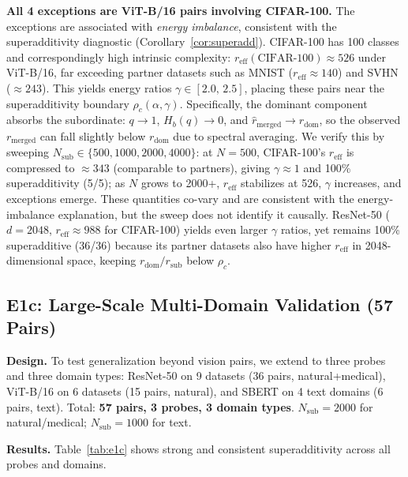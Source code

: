\documentclass{article}
\begin{document}
\textbf{All 4 exceptions are ViT-B/16 pairs involving CIFAR-100.}
The exceptions are associated with \emph{energy imbalance}, consistent with
the superadditivity diagnostic (Corollary~\ref{cor:superadd}).
CIFAR-100 has 100 classes and correspondingly high intrinsic complexity:
$r_{\mathrm{eff}}(\text{CIFAR-100})\approx526$ under ViT-B/16, far exceeding
partner datasets such as MNIST ($r_{\mathrm{eff}}\approx140$) and SVHN ($\approx243$).
This yields energy ratios $\gamma\in[2.0,\,2.5]$, placing these pairs
near the superadditivity boundary $\rho_c(\alpha,\gamma)$.
Specifically, the dominant component absorbs the subordinate:
$q\to1$, $H_b(q)\to0$, and $\hat{r}_{\mathrm{merged}}\to r_{\mathrm{dom}}$,
so the observed $r_{\mathrm{merged}}$ can fall slightly below $r_{\mathrm{dom}}$
due to spectral averaging.
We verify this by sweeping $N_{\mathrm{sub}}\in\{500,1000,2000,4000\}$:
at $N{=}500$, CIFAR-100's $r_{\mathrm{eff}}$ is compressed to $\approx343$
(comparable to partners), giving $\gamma\approx1$ and 100\% superadditivity (5/5);
as $N$ grows to 2000+, $r_{\mathrm{eff}}$ stabilizes at 526, $\gamma$ increases,
and exceptions emerge.  These quantities co-vary and are consistent with the
energy-imbalance explanation, but the sweep does not identify it causally.
ResNet-50 ($d{=}2048$, $r_{\mathrm{eff}}\approx988$ for CIFAR-100)
yields even larger $\gamma$ ratios, yet remains 100\% superadditive (36/36)
because its partner datasets also have higher $r_{\mathrm{eff}}$ in 2048-dimensional space,
keeping $r_{\mathrm{dom}}/r_{\mathrm{sub}}$ below $\rho_c$.

\subsection{E1c: Large-Scale Multi-Domain Validation (57 Pairs)}
\label{sec:e1c}

\textbf{Design.}
To test generalization beyond vision pairs, we extend to three probes and
three domain types: ResNet-50 on 9 datasets (36 pairs, natural+medical),
ViT-B/16 on 6 datasets (15 pairs, natural), and SBERT \citep{reimers2019sentencebert}
on 4 text domains (6 pairs, text). Total: \textbf{57 pairs, 3 probes, 3 domain types}.
$N_{\mathrm{sub}}=2000$ for natural/medical; $N_{\mathrm{sub}}=1000$ for text.

\textbf{Results.}
Table~\ref{tab:e1c} shows strong and consistent superadditivity across all probes and domains.
\end{document}

